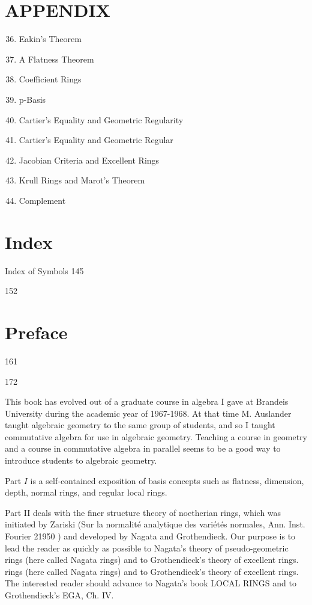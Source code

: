 \section{APPENDIX}
\begin{enumerate}
  \setcounter{enumi}{35}
  \item Eakin's Theorem

  \item A Flatness Theorem

  \item Coefficient Rings

  \item p-Basis

  \item Cartier's Equality and Geometric Regularity

  \item Cartier's Equality and Geometric Regular

  \item Jacobian Criteria and Excellent Rings

  \item Krull Rings and Marot's Theorem

  \item Complement

\end{enumerate}
\section{Index}
Index of Symbols 145

152

\section{Preface}
161

172

This book has evolved out of a graduate course in algebra I gave at Brandeis University during the academic year of 1967-1968. At that time M. Auslander taught algebraic geometry to the same group of students, and so I taught commutative algebra for use in algebraic geometry. Teaching a course in geometry and a course in commutative algebra in parallel seems to be a good way to introduce students to algebraic geometry.

Part $I$ is a self-contained exposition of basis concepts such as flatness, dimension, depth, normal rings, and regular local rings.

Part II deals with the finer structure theory of noetherian rings, which was initiated by Zariski (Sur la normalité analytique des variétés normales, Ann. Inst. Fourier 21950 ) and developed by Nagata and Grothendieck. Our purpose is to lead the reader as quickly as possible to Nagata's theory of pseudo-geometric rings (here called Nagata rings) and to Grothendieck's theory of excellent rings. rings (here called Nagata rings) and to Grothendieck's theory of excellent rings. The interested reader should advance to Nagata's book LOCAL RINGS and to Grothendieck's EGA, Ch. IV.

